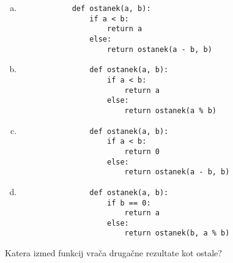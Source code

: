 \documentclass[arhiv, 10pt]{../izpit}
\begin{document}
        \begin{multicols}{2}
        \begin{enumerate}[(a)]
\item 
            \begin{verbatim}
            def ostanek(a, b):
                if a < b:
                    return a
                else:
                    return ostanek(a - b, b)
            \end{verbatim}
        
\item 
                \begin{verbatim}
                def ostanek(a, b):
                    if a < b:
                        return a
                    else:
                        return ostanek(a % b)
                \end{verbatim}
            
\item 
                \begin{verbatim}
                def ostanek(a, b):
                    if a < b:
                        return 0
                    else:
                        return ostanek(a - b, b)
                \end{verbatim}
            
\item 
                \begin{verbatim}
                def ostanek(a, b):
                    if b == 0:
                        return a
                    else:
                        return ostanek(b, a % b)
                \end{verbatim}
            
\end{enumerate}

        \end{multicols}
    
        \naloga*
        
        Katera izmed funkcij vrača drugačne rezultate kot ostale?
    
\end{document}
